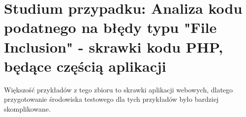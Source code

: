 \section{Studium przypadku: Analiza kodu podatnego na błędy typu "File Inclusion" - skrawki kodu PHP, będące częścią aplikacji}
\label{sec:analiza_blednego_kodu_php}

Większość przykładów z tego zbioru to skrawki aplikacji webowych, dlatego przygotowanie środowiska testowego dla tych przykładów było bardziej skomplikowane. 








